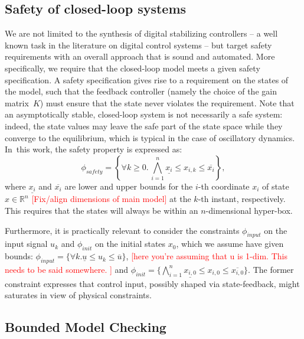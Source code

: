 \documentclass[twocolumn]{autart}    %
\newcommand{\addtodo}[1]{\textcolor{red}{[#1]}}
\renewcommand{\note}[1]{\textcolor{red}{[#1]}}
\begin{document}
\subsection{Safety of closed-loop systems}

We are not limited to the synthesis of digital stabilizing controllers -- a
well known task in the literature on digital control systems -- but target
safety requirements with an overall approach that is sound and automated. 
More specifically, we require that the closed-loop model 
meets a given safety specification.  
A safety specification gives rise to a requirement on the states of the model, such
that the feedback controller (namely the choice of the gain matrix~$K$)
must ensure that the state never violates the requirement.  Note that an asymptotically 
stable, closed-loop system is not necessarily a safe system: indeed, the 
state values may leave the safe part of the state space while they converge
to the equilibrium, which is typical in the case of oscillatory dynamics. 
In~this work, the safety property is expressed as: 
%
\begin{equation}
\label{eq:safetyliteral}
\phi_\mathit{safety} = \left\{ \forall k\ge 0.\, \bigwedge_{i=1}^{n}{\underline{x_{i}} \leq x_{i,k} \leq \overline{x_{i}}}\right\},
\end{equation}
%
%
where $\underline{x_{i}}$ and $\overline{x_{i}}$ are lower and upper bounds
for the $i$-th coordinate $x_{i}$ of state $x\in \mathbb R^n$ 
\note{Fix/align dimensions of main model} 
at the $k$-th instant, respectively.  This requires that the states will always be within an $n$-dimensional hyper-box.

Furthermore, it is practically relevant to consider the 
constraints $\phi_\mathit{input}$ on the input
signal $u_{k}$ and $\phi_\mathit{init}$ on the initial states $x_0$,
which we assume have given bounds:
$\phi_\mathit{input} = \{\forall k.\underline{u} \leq u_{k} \leq \overline{u}\} $, 
\note{here you're assuming that u is 1-dim. This needs to be said somewhere. }
and $\phi_\mathit{init} = \{ \bigwedge_{i=1}^{n} \underline{x_{i,0}} \leq x_{i,0} \leq \overline{x_{i,0}}\}$. 
The former constraint expresses that control input, possibly shaped via state-feedback, 
might saturates in view of physical constraints.



\subsection{Bounded Model Checking}
\label{sec:BMC}
\end{document}
